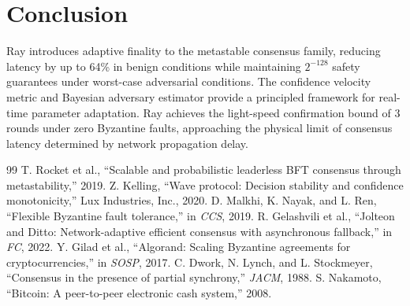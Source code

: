 \section{Conclusion}

\label{sec:conclusion}

Ray introduces adaptive finality to the metastable consensus family, reducing latency
by up to 64\% in benign conditions while maintaining $2^{-128}$ safety guarantees under
worst-case adversarial conditions. The confidence velocity metric and Bayesian adversary
estimator provide a principled framework for real-time parameter adaptation. Ray
achieves the light-speed confirmation bound of $3$ rounds under zero Byzantine faults,
approaching the physical limit of consensus latency determined by network propagation delay.

\begin{thebibliography}{99}
 T. Rocket et al., ``Scalable and probabilistic leaderless BFT consensus through metastability,'' 2019.
 Z. Kelling, ``Wave protocol: Decision stability and confidence monotonicity,'' Lux Industries, Inc., 2020.
 D. Malkhi, K. Nayak, and L. Ren, ``Flexible Byzantine fault tolerance,'' in \emph{CCS}, 2019.
 R. Gelashvili et al., ``Jolteon and Ditto: Network-adaptive efficient consensus with asynchronous fallback,'' in \emph{FC}, 2022.
 Y. Gilad et al., ``Algorand: Scaling Byzantine agreements for cryptocurrencies,'' in \emph{SOSP}, 2017.
 C. Dwork, N. Lynch, and L. Stockmeyer, ``Consensus in the presence of partial synchrony,'' \emph{JACM}, 1988.
 S. Nakamoto, ``Bitcoin: A peer-to-peer electronic cash system,'' 2008.
\end{thebibliography}

